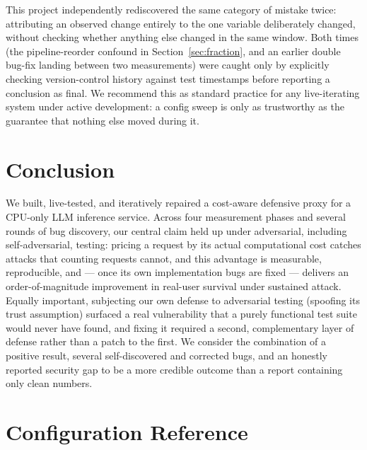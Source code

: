 \documentclass[11pt]{article}
\begin{document}
This project independently rediscovered the same category of mistake twice:
attributing an observed change entirely to the one variable deliberately
changed, without checking whether anything else changed in the same window.
Both times (the pipeline-reorder confound in Section~\ref{sec:fraction}, and
an earlier double bug-fix landing between two measurements) were caught only
by explicitly checking version-control history against test timestamps before
reporting a conclusion as final. We recommend this as standard practice for
any live-iterating system under active development: a config sweep is only as
trustworthy as the guarantee that nothing else moved during it.

\section{Conclusion}

We built, live-tested, and iteratively repaired a cost-aware defensive proxy
for a CPU-only LLM inference service. Across four measurement phases and
several rounds of bug discovery, our central claim held up under adversarial,
including self-adversarial, testing: pricing a request by its actual
computational cost catches attacks that counting requests cannot, and this
advantage is measurable, reproducible, and --- once its own implementation
bugs are fixed --- delivers an order-of-magnitude improvement in real-user
survival under sustained attack. Equally important, subjecting our own
defense to adversarial testing (spoofing its trust assumption) surfaced a real
vulnerability that a purely functional test suite would never have found, and
fixing it required a second, complementary layer of defense rather than a
patch to the first. We consider the combination of a positive result, several
self-discovered and corrected bugs, and an honestly reported security gap to
be a more credible outcome than a report containing only clean numbers.

\appendix

\section{Configuration Reference}
\end{document}
